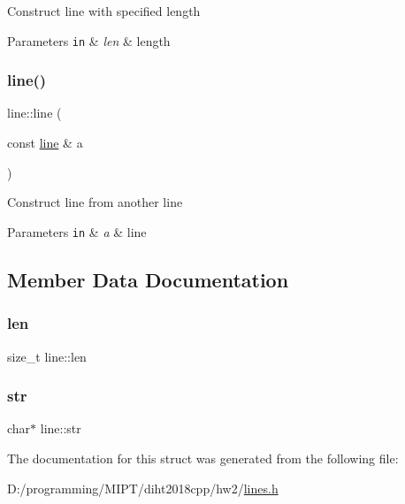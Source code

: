 Construct line with specified length


\begin{DoxyParams}[1]{Parameters}
\mbox{\tt in}  & {\em len} & length \\
\hline
\end{DoxyParams}
\mbox{\label{structline_aec404eb5f8e12154642b1efee43dca4b}} 
\subsubsection{\texorpdfstring{line()}{line()}\hspace{0.1cm}{\footnotesize\ttfamily [2/2]}}
{\footnotesize\ttfamily line\+::line (\begin{DoxyParamCaption}\item[{const \mbox{\hyperlink{structline}{line}} \&}]{a }\end{DoxyParamCaption})\hspace{0.3cm}{\ttfamily [inline]}}

Construct line from another line


\begin{DoxyParams}[1]{Parameters}
\mbox{\tt in}  & {\em a} & line \\
\hline
\end{DoxyParams}


\subsection{Member Data Documentation}
\mbox{\label{structline_a5c7cb645047f41a604a90acc93757324}} 
\subsubsection{\texorpdfstring{len}{len}}
{\footnotesize\ttfamily size\+\_\+t line\+::len}

\mbox{\label{structline_ab000f729df2892e18ff773ad903b2254}} 
\subsubsection{\texorpdfstring{str}{str}}
{\footnotesize\ttfamily char$\ast$ line\+::str}



The documentation for this struct was generated from the following file\+:\begin{DoxyCompactItemize}
\item 
D\+:/programming/\+M\+I\+P\+T/diht2018cpp/hw2/\mbox{\hyperlink{lines_8h}{lines.\+h}}\end{DoxyCompactItemize}
